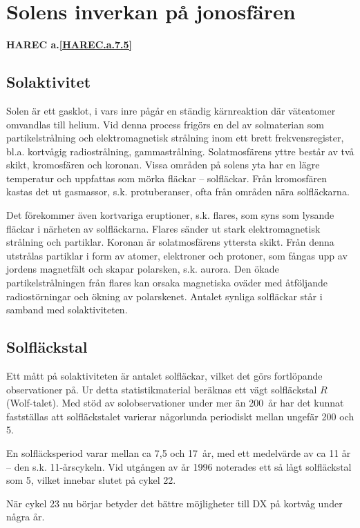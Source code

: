 \section{Solens inverkan på jonosfären}
\textbf{
HAREC a.\ref{HAREC.a.7.5}\label{myHAREC.a.7.5}
}

\subsection{Solaktivitet}

Solen är ett gasklot, i vars inre pågår en ständig kärnreaktion där
väteatomer omvandlas till helium. Vid denna process frigörs en del av
solmaterian som partikelstrålning och elektromagnetisk strålning inom
ett brett frekvensregister, bl.a. kortvågig radiostrålning,
gammastrålning. Solatmosfärens yttre består av två skikt, kromosfären
och koronan. Vissa områden på solens yta har en lägre temperatur och
uppfattas som mörka fläckar -- solfläckar. Från kromosfären kastas det
ut gasmassor, s.k. protuberanser, ofta från områden nära solfläckarna.

Det förekommer även kortvariga eruptioner, s.k. flares, som syns som
lysande fläckar i närheten av solfläckarna. Flares sänder ut stark
elektromagnetisk strålning och partiklar. Koronan är solatmosfärens
yttersta skikt. Från denna utstrålas partiklar i form av atomer,
elektroner och protoner, som fångas upp av jordens magnetfält och
skapar polarsken, s.k. aurora. Den ökade partikelstrålningen från
flares kan orsaka magnetiska oväder med åtföljande radiostörningar och
ökning av polarskenet. Antalet synliga solfläckar står i samband med
solaktiviteten.

\subsection{Solfläckstal}

Ett mått på solaktiviteten är antalet solfläckar, vilket det görs
fortlöpande observationer på. Ur detta statistikmaterial beräknas ett
vägt solfläckstal \(R\) (Wolf-talet). Med stöd av solobservationer
under mer än 200~år har det kunnat fastställas att solfläckstalet
varierar någorlunda periodiskt mellan ungefär 200 och 5.

En solfläcksperiod varar mellan ca 7,5 och 17~år, med ett medelvärde
av ca 11 år -- den s.k. 11-årscykeln. Vid utgången av år 1996
noterades ett så lågt solfläckstal som 5, vilket innebar slutet på
cykel 22.

När cykel 23 nu börjar betyder det bättre möjligheter till DX på
kortvåg under några år.

